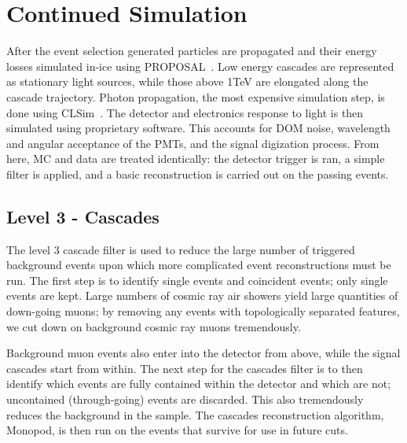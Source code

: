\documentclass[main.tex]{subfiles}
\begin{document}
\section{Continued Simulation}

After the event selection generated particles are propagated and their energy losses simulated in-ice using PROPOSAL~\cite{Koehne:2013gpa}.
Low energy cascades are represented as stationary light sources, while those above 1TeV are elongated along the cascade trajectory. 
Photon propagation, the most expensive simulation step, is done using CLSim~\cite{CLSim}. 
The detector and electronics response to light is then simulated using proprietary software. 
This accounts for DOM noise, wavelength and angular acceptance of the PMTs, and the signal digization process.
From here, MC and data are treated identically: the detector trigger is ran, a simple filter is applied, and a basic reconstruction is carried out on the passing events. 

\subsection{Level 3 - Cascades}

The level 3 cascade filter is used to reduce the large number of triggered background events upon which more complicated event reconstructions must be run. 
The first step is to identify single events and coincident events; only single events are kept. 
Large numbers of cosmic ray air showers yield large quantities of down-going muons; by removing any events with topologically separated features, we cut down on background cosmic ray muons tremendously. 

Background muon events also enter into the detector from above, while the signal cascades start from within.
The next step for the cascades filter is to then identify which events are fully contained within the detector and which are not; uncontained (through-going) events are discarded. 
This also tremendously reduces the background in the sample. 
The cascades reconstruction algorithm, Monopod, is then run on the events that survive for use in future cuts. 
\end{document}
